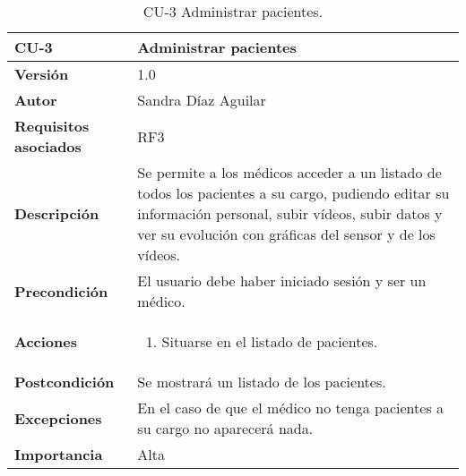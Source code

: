 \begin{table}[p]
	\centering
	\begin{tabularx}{\linewidth}{ p{} p{} }
		\toprule
		\textbf{CU-3}    & \textbf{Administrar pacientes }\\
		\toprule
		\textbf{Versión}              & 1.0    \\
		\textbf{Autor}                & Sandra Díaz Aguilar \\
		\textbf{Requisitos asociados} & RF3 \\
		\textbf{Descripción}          & Se permite a los médicos acceder a un listado de todos los pacientes a su cargo, pudiendo editar su información personal, subir vídeos, subir datos y ver su evolución con gráficas del sensor y de los vídeos. \\
		\textbf{Precondición}         & El usuario debe haber iniciado sesión y ser un médico. \\
		\textbf{Acciones}             &
		\begin{enumerate}
			\def\labelenumi{\arabic{enumi}.}
			\tightlist
			\item Situarse en el listado de pacientes. 
		\end{enumerate}\\
		\textbf{Postcondición}        & Se mostrará un listado de los pacientes. \\
		\textbf{Excepciones}          & En el caso de que el médico no tenga pacientes a su cargo no aparecerá nada.  \\
		\textbf{Importancia}          & Alta \\
		\bottomrule
	\end{tabularx}
	\caption{CU-3 Administrar pacientes.}
\end{table}


